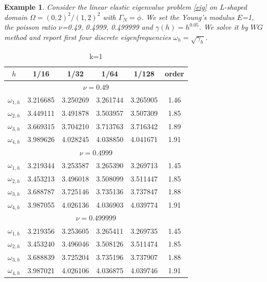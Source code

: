 \documentclass[leqno,CJK]{siamltex704}
\numberwithin{equation}{section}
\newtheorem{example}{Example}[section]
\begin{document}
\begin{example}
	Consider the linear elastic eigenvalue problem \eqref{eig} on L-shaped  domain $\Omega=(0,2)^2/(1,2)^2$ with $\Gamma_N=\phi$. We set the Young's modulus $E$=1, the poisson ratio $\nu$=0.49, 0.4999, 0.499999 and $\gamma(h)=h^{0.05}$. We solve it by $WG$ method and report first four discrete eigenfrequencies $\omega_h=\sqrt{\gamma_h}$.
\end{example}

\begin{table}[H]
	\begin{center}
		\caption{k=1}\label{t3}
		\begin{tabular}{|c|c|c|c|c|c|}\hline
				$h$&1/16&1/32&1/64&1/128&order\\ \hline\hline
				\multicolumn{6}{|c|}{$\nu=0.49$}\\ \hline
				$\omega_{1,h}$&3.216685 & 3.250269 & 3.261744 & 3.265905 & 1.46 \\\hline
				$\omega_{2,h}$&3.449111 & 3.491878 & 3.503957 & 3.507309 & 1.85 \\ \hline
				$\omega_{3,h}$&3.669315 & 3.704210 & 3.713763 & 3.716342 & 1.89 \\ \hline
				$\omega_{4,h}$&3.989626 & 4.028245 & 4.038850 & 4.041671 & 1.91 \\ \hline
			\multicolumn{6}{|c|}{$\nu=0.4999$}\\ \hline
				$\omega_{1,h}$&3.219344 & 3.253587 & 3.265390 & 3.269713 & 1.45 \\ \hline
				$\omega_{2,h}$&3.453213 & 3.496018 & 3.508099 & 3.511447 & 1.85 \\ \hline
				$\omega_{3,h}$&3.688787 & 3.725146 & 3.735136 & 3.737847 & 1.88 \\ \hline
				$\omega_{4,h}$&3.987055 & 4.026136 & 4.036903 & 4.039774 & 1.91 \\ \hline
		\multicolumn{6}{|c|}{$\nu=0.499999$}\\ \hline
			$\omega_{1,h}$&3.219356 & 3.253605 & 3.265411 & 3.269735 & 1.45 \\ \hline
			$\omega_{2,h}$&3.453240 & 3.496046 & 3.508126 & 3.511474 & 1.85 \\ 
			\hline
			$\omega_{3,h}$&3.688839 & 3.725204 & 3.735196 & 3.737907 & 1.88 \\ \hline
			$\omega_{4,h}$&3.987021 & 4.026106 & 4.036875 & 4.039746 & 1.91 \\ \hline
		\end{tabular}
	\end{center}
\end{table}
\end{document}
